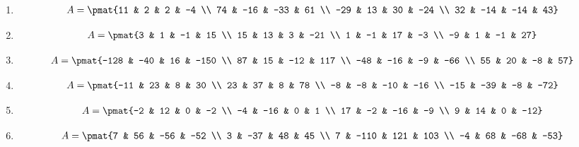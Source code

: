 \begin{enumerate}
\item

\begin{align*}
A = \pmat{11 & 2 & 2 & -4 \\ 74 & -16 & -33 & 61 \\ -29 & 13 & 30 & -24 \\ 32 & -14 & -14 & 43}
\end{align*}

\item

\begin{align*}
A = \pmat{3 & 1 & -1 & 15 \\ 15 & 13 & 3 & -21 \\ 1 & -1 & 17 & -3 \\ -9 & 1 & -1 & 27}
\end{align*}

\item

\begin{align*}
A = \pmat{-128 & -40 & 16 & -150 \\ 87 & 15 & -12 & 117 \\ -48 & -16 & -9 & -66 \\ 55 & 20 & -8 & 57}
\end{align*}

\item

\begin{align*}
A = \pmat{-11 & 23 & 8 & 30 \\ 23 & 37 & 8 & 78 \\ -8 & -8 & -10 & -16 \\ -15 & -39 & -8 & -72}
\end{align*}

\item

\begin{align*}
A = \pmat{-2 & 12 & 0 & -2 \\ -4 & -16 & 0 & 1 \\ 17 & -2 & -16 & -9 \\ 9 & 14 & 0 & -12}
\end{align*}

\item

\begin{align*}
A = \pmat{7 & 56 & -56 & -52 \\ 3 & -37 & 48 & 45 \\ 7 & -110 & 121 & 103 \\ -4 & 68 & -68 & -53}
\end{align*}


\end{enumerate}
